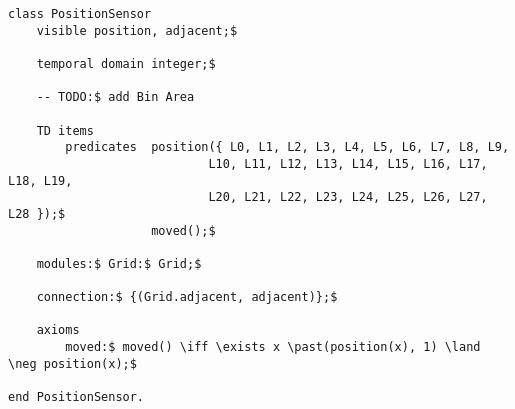 \begin{lstlisting}[fontadjust, mathescape, frame=tlb] 
class PositionSensor
    visible position, adjacent;$

    temporal domain integer;$

    -- TODO:$ add Bin Area

    TD items 
        predicates  position({ L0, L1, L2, L3, L4, L5, L6, L7, L8, L9,
                            L10, L11, L12, L13, L14, L15, L16, L17, L18, L19,
                            L20, L21, L22, L23, L24, L25, L26, L27, L28 });$
                    moved();$

    modules:$ Grid:$ Grid;$

    connection:$ {(Grid.adjacent, adjacent)};$

    axioms
        moved:$ moved() \iff \exists x \past(position(x), 1) \land \neg position(x);$

end PositionSensor.\end{lstlisting}